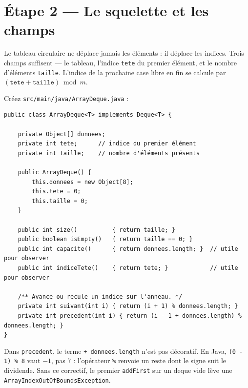 \documentclass[11pt,a4paper]{article}
\begin{document}
\section{Étape 2 --- Le squelette et les champs}

\begin{lienbox}[Ce qu'on matérialise du CM]
Le tableau circulaire ne déplace jamais les éléments : il déplace les
indices. Trois champs suffisent --- le tableau, l'indice \texttt{tete} du
premier élément, et le nombre d'éléments \texttt{taille}. L'indice de la
prochaine case libre en fin se calcule par $(\texttt{tete} + \texttt{taille})
\bmod m$.
\end{lienbox}

Créez \texttt{src/main/java/ArrayDeque.java} :

\begin{lstlisting}[caption={\texttt{ArrayDeque.java} --- champs et utilitaires}]
public class ArrayDeque<T> implements Deque<T> {

    private Object[] donnees;
    private int tete;      // indice du premier élément
    private int taille;    // nombre d'éléments présents

    public ArrayDeque() {
        this.donnees = new Object[8];
        this.tete = 0;
        this.taille = 0;
    }

    public int size()          { return taille; }
    public boolean isEmpty()   { return taille == 0; }
    public int capacite()      { return donnees.length; }  // utile pour observer
    public int indiceTete()    { return tete; }            // utile pour observer

    /** Avance ou recule un indice sur l'anneau. */
    private int suivant(int i) { return (i + 1) % donnees.length; }
    private int precedent(int i) { return (i - 1 + donnees.length) % donnees.length; }
}
\end{lstlisting}

\begin{attentionbox}
Dans \texttt{precedent}, le terme \texttt{+ donnees.length} n'est pas
décoratif. En Java, \texttt{(0 - 1) \% 8} vaut $-1$, pas $7$ : l'opérateur
\texttt{\%} renvoie un reste dont le signe suit le dividende. Sans ce
correctif, le premier \texttt{addFirst} sur un deque vide lève une
\texttt{ArrayIndexOutOfBoundsException}.
\end{attentionbox}
\end{document}
